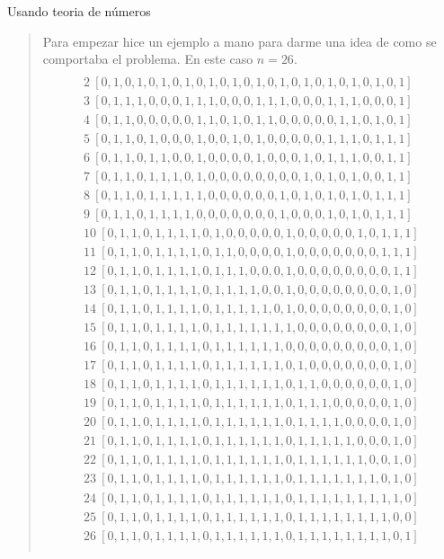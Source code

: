 \textcolor{bibi}{Usando teoria de números}
\begin{quote}
    Para empezar hice un ejemplo a mano para darme una idea de como se comportaba el problema. En este caso $n=26$.
    \begin{align*}
        [0,0,0,0,0,0,0,0,0,0,0,0,0,0,0,0,0,0,0,0,0,0,0,0,0,0] \\
    2 \ [0,1,0,1,0,1,0,1,0,1,0,1,0,1,0,1,0,1,0,1,0,1,0,1,0,1] \\
    3 \ [0,1,1,1,0,0,0,1,1,1,0,0,0,1,1,1,0,0,0,1,1,1,0,0,0,1] \\
    4 \ [0,1,1,0,0,0,0,0,1,1,0,1,0,1,1,0,0,0,0,0,1,1,0,1,0,1] \\
    5 \ [0,1,1,0,1,0,0,0,1,0,0,1,0,1,0,0,0,0,0,1,1,1,0,1,1,1] \\
    6 \ [0,1,1,0,1,1,0,0,1,0,0,0,0,1,0,0,0,1,0,1,1,1,0,0,1,1] \\
    7 \ [0,1,1,0,1,1,1,0,1,0,0,0,0,0,0,0,0,1,0,1,0,1,0,0,1,1] \\
    8 \ [0,1,1,0,1,1,1,1,1,0,0,0,0,0,0,1,0,1,0,1,0,1,0,1,1,1] \\
    9 \ [0,1,1,0,1,1,1,1,0,0,0,0,0,0,0,1,0,0,0,1,0,1,0,1,1,1] \\
    10 \ [0,1,1,0,1,1,1,1,0,1,0,0,0,0,0,1,0,0,0,0,0,1,0,1,1,1] \\
    11 \ [0,1,1,0,1,1,1,1,0,1,1,0,0,0,0,1,0,0,0,0,0,0,0,1,1,1] \\
    12 \ [0,1,1,0,1,1,1,1,0,1,1,1,0,0,0,1,0,0,0,0,0,0,0,0,1,1] \\
    13 \ [0,1,1,0,1,1,1,1,0,1,1,1,1,0,0,1,0,0,0,0,0,0,0,0,1,0] \\
    14 \ [0,1,1,0,1,1,1,1,0,1,1,1,1,1,0,1,0,0,0,0,0,0,0,0,1,0] \\
    15 \ [0,1,1,0,1,1,1,1,0,1,1,1,1,1,1,1,0,0,0,0,0,0,0,0,1,0] \\
    16 \ [0,1,1,0,1,1,1,1,0,1,1,1,1,1,1,0,0,0,0,0,0,0,0,0,1,0] \\
    17 \ [0,1,1,0,1,1,1,1,0,1,1,1,1,1,1,0,1,0,0,0,0,0,0,0,1,0] \\
    18 \ [0,1,1,0,1,1,1,1,0,1,1,1,1,1,1,0,1,1,0,0,0,0,0,0,1,0] \\
    19 \ [0,1,1,0,1,1,1,1,0,1,1,1,1,1,1,0,1,1,1,0,0,0,0,0,1,0] \\
    20 \ [0,1,1,0,1,1,1,1,0,1,1,1,1,1,1,0,1,1,1,1,0,0,0,0,1,0] \\
    21 \ [0,1,1,0,1,1,1,1,0,1,1,1,1,1,1,0,1,1,1,1,1,0,0,0,1,0] \\
    22 \ [0,1,1,0,1,1,1,1,0,1,1,1,1,1,1,0,1,1,1,1,1,1,0,0,1,0] \\
    23 \ [0,1,1,0,1,1,1,1,0,1,1,1,1,1,1,0,1,1,1,1,1,1,1,0,1,0] \\
    24 \ [0,1,1,0,1,1,1,1,0,1,1,1,1,1,1,0,1,1,1,1,1,1,1,1,1,0] \\
    25 \ [0,1,1,0,1,1,1,1,0,1,1,1,1,1,1,0,1,1,1,1,1,1,1,1,0,0] \\
    26 \ [0,1,1,0,1,1,1,1,0,1,1,1,1,1,1,0,1,1,1,1,1,1,1,1,0,1] \\
    \end{align*}


\end{quote}
